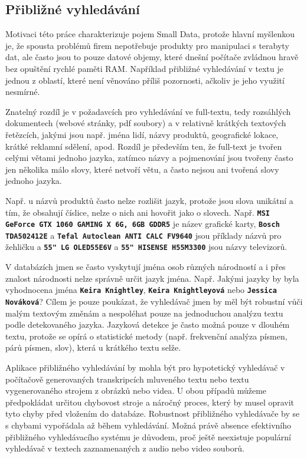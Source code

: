 \documentclass[11pt,letterpaper,oneside,openright]{book}
\newcommand{\bftt}[1]{\texttt{\textbf{#1}}}
\begin{document}
\subsection{Přibližné vyhledávání}
Motivaci této práce charakterizuje pojem Small Data, protože hlavní myšlenkou
je, že spousta problémů firem nepotřebuje produkty pro manipulaci s terabyty
dat, ale často jsou to pouze datové objemy, které dnešní počítače zvládnou
hravě bez opuštění rychlé paměti RAM. Například přibližné vyhledávání v textu
je jednou z oblastí, které není věnováno příliš pozornosti, ačkoliv je jeho
využití nesmírné.

Znatelný rozdíl je v požadavcích pro vyhledávání ve full-textu, tedy rozsáhlých
dokumentech (webové stránky, pdf soubory) a v relativně krátkých textových
řetězcích, jakými jsou např. jména lidí, názvy produktů, geografické lokace,
krátké reklamní sdělení, apod. Rozdíl je především ten, že full-text je tvořen
celými větami jednoho jazyka, zatímco názvy a pojmenování jsou tvořeny často
jen několika málo slovy, které netvoří větu, a často nejsou ani tvořená slovy
jednoho jazyka.

Např. u názvů produktů často nelze rozlišit jazyk, protože jsou slova unikátní
a tím, že obsahují číslice, nelze o nich ani hovořit jako o slovech. Např.
\bftt{MSI GeForce GTX 1060 GAMING X 6G, 6GB GDDR5} je název grafické karty,
\bftt{Bosch TDA502412E} a \bftt{Tefal Autoclean ANTI CALC FV9640} jsou příklady
názvů pro žehličku a \bftt{55" LG OLED55E6V} a \bftt{55" HISENSE H55M3300} jsou
názvy televizorů.

V databázích jmen se často vyskytují jména osob různých národností a i přes
znalost národnosti nelze správně určit jazyk jména. Např. Jakými jazyky by byla
vyhodnocena jména \bftt{Keira Knightley}, \bftt{Keira Knightleyová} nebo
\bftt{Jessica Nováková}? Cílem je pouze poukázat, že vyhledávač jmen by měl být
robustní vůči malým textovým změnám a nespoléhat pouze na jednoduchou analýzu
textu podle detekovaného jazyka. Jazyková detekce je často možná pouze v
dlouhém textu, protože se opírá o statistické metody (např. frekvenční analýza
písmen, párů písmen, slov), která u krátkého textu selže.

Aplikace přibližného vyhledávání by mohla být pro hypotetický vyhledávač v
počítačově generovaných transkripcích mluveného textu nebo textu vygenerovaného
strojem z obrázků nebo videa. U obou případů můžeme předpokládat určitou
chybovost stroje a náročný proces, který by musel opravit tyto chyby před
vložením do databáze. Robustnost přibližného vyhledávače by se s chybami
vypořádala až během vyhledávání. Možná právě absence efektivního přibližného
vyhledávacího systému je důvodem, proč ještě neexistuje populární vyhledávač v
textech zaznamenaných z audio nebo video souborů.
\end{document}
